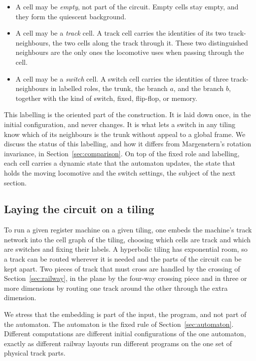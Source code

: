 \begin{itemize}
  \item A cell may be \emph{empty}, not part of the circuit. Empty cells stay empty, and they form the
  quiescent background.
  \item A cell may be a \emph{track} cell. A track cell carries the identities of its two track-neighbours, the
  two cells along the track through it. These two distinguished neighbours are the only ones the locomotive
  uses when passing through the cell.
  \item A cell may be a \emph{switch} cell. A switch cell carries the identities of three track-neighbours in
  labelled roles, the trunk, the branch $a$, and the branch $b$, together with the kind of switch, fixed,
  flip-flop, or memory.
\end{itemize}

This labelling is the oriented part of the construction. It is laid down once, in the initial configuration,
and never changes. It is what lets a switch in any tiling know which of its neighbours is the trunk without
appeal to a global frame. We discuss the status of this labelling, and how it differs from Margenstern's
rotation invariance, in Section~\ref{sec:comparison}. On top of the fixed role and labelling, each cell carries
a dynamic state that the automaton updates, the state that holds the moving locomotive and the switch settings,
the subject of the next section.

\subsection{Laying the circuit on a tiling}

To run a given register machine on a given tiling, one embeds the machine's track network into the cell graph
of the tiling, choosing which cells are track and which are switches and fixing their labels. A hyperbolic
tiling has exponential room, so a track can be routed wherever it is needed and the parts of the circuit can
be kept apart. Two pieces of track that must cross are handled by the crossing of Section~\ref{sec:railway}, in
the plane by the four-way crossing piece and in three or more dimensions by routing one track around the other
through the extra dimension.

We stress that the embedding is part of the input, the program, and not part of the automaton. The automaton
is the fixed rule of Section~\ref{sec:automaton}. Different computations are different initial configurations
of the one automaton, exactly as different railway layouts run different programs on the one set of physical
track parts.

